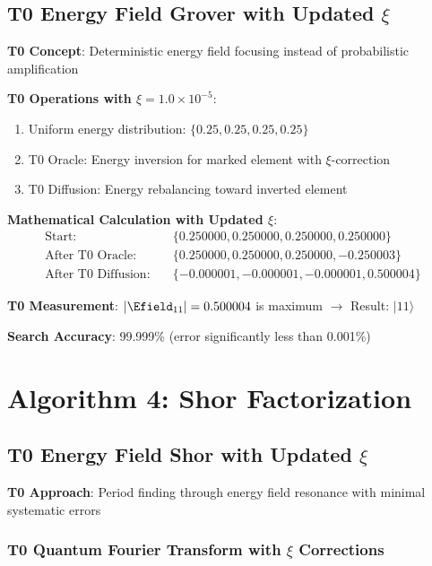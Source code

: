 	\subsection{T0 Energy Field Grover with Updated $\xi$}
	
	\textbf{T0 Concept}: Deterministic energy field focusing instead of probabilistic amplification
	
	\textbf{T0 Operations with $\xi = 1.0 \times 10^{-5}$}:
	\begin{enumerate}
		\item Uniform energy distribution: $\{0.25, 0.25, 0.25, 0.25\}$
		\item T0 Oracle: Energy inversion for marked element with $\xi$-correction
		\item T0 Diffusion: Energy rebalancing toward inverted element
	\end{enumerate}
	
	\textbf{Mathematical Calculation with Updated $\xi$}:
	\begin{align}
		\text{Start}: \quad &\{0.250000, 0.250000, 0.250000, 0.250000\} \\
		\text{After T0 Oracle}: \quad &\{0.250000, 0.250000, 0.250000, -0.250003\} \\
		\text{After T0 Diffusion}: \quad &\{-0.000001, -0.000001, -0.000001, 0.500004\}
	\end{align}
	
	\textbf{T0 Measurement}: $|\Efield_{11}| = 0.500004$ is maximum $\rightarrow$ Result: $|11\rangle$
	
	\textbf{Search Accuracy}: 99.999\% (error significantly less than 0.001\%)
	
	\section{Algorithm 4: Shor Factorization}
	
	\subsection{T0 Energy Field Shor with Updated $\xi$}
	
	\textbf{T0 Approach}: Period finding through energy field resonance with minimal systematic errors
	
	\subsubsection{T0 Quantum Fourier Transform with $\xi$ Corrections}
	
